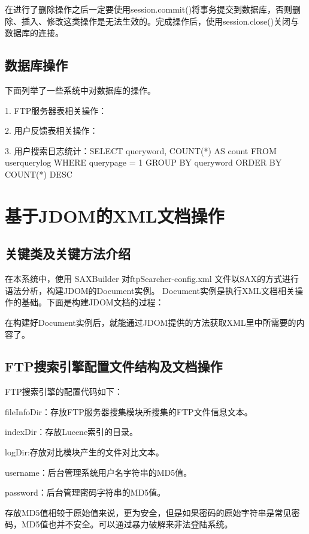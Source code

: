 

在进行了删除操作之后一定要使用session.commit()将事务提交到数据库，否则删除、插入、修改这类操作是无法生效的。完成操作后，使用session.close()关闭与数据库的连接。
\subsection{数据库操作}
下面列举了一些系统中对数据库的操作。

1. FTP服务器表相关操作：



2. 用户反馈表相关操作：



3. 用户搜索日志统计：SELECT queryword, COUNT(*) AS count
		             FROM userquerylog WHERE querypage = 1 
		             GROUP BY queryword ORDER BY COUNT(*) DESC
\section{基于JDOM的XML文档操作}
\subsection{关键类及关键方法介绍}
在本系统中，使用 SAXBuilder 对ftpSearcher-config.xml 文件以SAX的方式进行语法分析，构建JDOM的Document实例。 Document实例是执行XML文档相关操作的基础。下面是构建JDOM文档的过程：



在构建好Document实例后，就能通过JDOM提供的方法获取XML里中所需要的内容了。

\subsection{FTP搜索引擎配置文件结构及文档操作}
FTP搜索引擎的配置代码如下：



fileInfoDir：存放FTP服务器搜集模块所搜集的FTP文件信息文本。

indexDir：存放Lucene索引的目录。

logDir:存放对比模块产生的文件对比文本。

username：后台管理系统用户名字符串的MD5值。

password：后台管理密码字符串的MD5值。

存放MD5值相较于原始值来说，更为安全，但是如果密码的原始字符串是常见密码，MD5值也并不安全。可以通过暴力破解来非法登陆系统。

